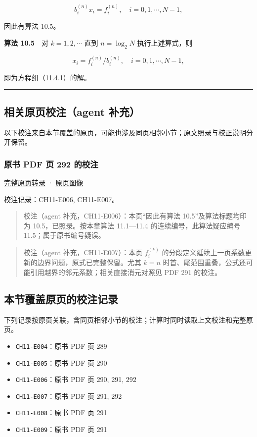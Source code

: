 \documentclass[
  10pt,
  fontset=fandol]{ctexart}
\providecommand{\tightlist}{%
  \setlength{\itemsep}{0pt}\setlength{\parskip}{0pt}}
\begin{document}
\[
b_i^{(n)}x_i=f_i^{(n)},\quad i=0,1,\cdots,N-1,
\]

因此有算法 10.5。

\textbf{算法 10.5}　对 \(k=1,2,\cdots\) 直到 \(n=\log_2 N\) 执行上述算式，则

\[
x_i=f_i^{(n)}/b_i^{(n)},\quad i=0,1,\cdots,N-1,
\]

即为方程组（11.4.1）的解。

\begin{center}\rule{0.5\linewidth}{0.5pt}\end{center}

\subsection{相关原页校注（agent 补充）}\label{ux76f8ux5173ux539fux9875ux6821ux6ce8agent-ux8865ux5145}

以下校注来自本节覆盖的原页，可能也涉及同页相邻小节；原文照录与校正说明分开保留。

\subsubsection{原书 PDF 页 292 的校注}\label{ux539fux4e66-pdf-ux9875-292-ux7684ux6821ux6ce8}

\href{../pages/pdf-292.md}{完整原页转录} · \href{../../source-images/pdf-292.jpeg}{原页图像}

校注记录：CH11-E006, CH11-E007。

\begin{quote}
校注（agent 补充，CH11-E006）：本页``因此有算法 10.5''及算法标题均印为 10.5，已照录。按本章算法 11.1---11.4 的连续编号，此算法疑应编号 11.5；属于原书编号疑误。
\end{quote}

\begin{quote}
校注（agent 补充，CH11-E007）：本页 \(f_i^{(k)}\) 的分段定义延续上一页系数更新的边界问题，原式已完整保留。尤其 \(k=n\) 时首、尾范围重叠，公式还可能引用越界的邻元系数；相关直接消元对照见 PDF 291 的校注。
\end{quote}

\subsection{本节覆盖原页的校注记录}\label{ux672cux8282ux8986ux76d6ux539fux9875ux7684ux6821ux6ce8ux8bb0ux5f55}

下列记录按原页关联，含同页相邻小节的校注；计算时同时读取上文校注和完整原页。

\begin{itemize}
\tightlist
\item
  \texttt{CH11-E004}：原书 PDF 页 289
\item
  \texttt{CH11-E005}：原书 PDF 页 290
\item
  \texttt{CH11-E006}：原书 PDF 页 290, 291, 292
\item
  \texttt{CH11-E007}：原书 PDF 页 291, 292
\item
  \texttt{CH11-E008}：原书 PDF 页 291
\item
  \texttt{CH11-E009}：原书 PDF 页 291
\end{itemize}
\end{document}
